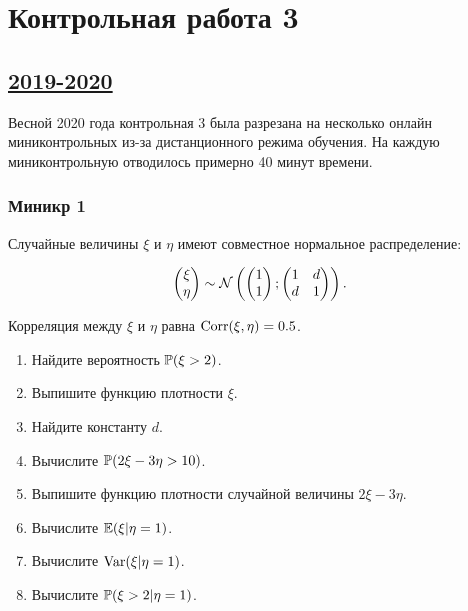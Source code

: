 \newpage
\thispagestyle{empty}
\section{Контрольная работа 3}


\subsection[2019-2020]{\hyperref[sec:sol_kr_03_2019_2020]{2019-2020}}
\label{sec:kr_03_2019_2020}

Весной 2020 года контрольная 3 была разрезана на несколько онлайн миниконтрольных из-за дистанционного режима обучения.
На каждую миниконтрольную отводилось примерно 40 минут времени. 

\subsubsection*{Миникр 1}

Случайные величины $\xi$ и $\eta$ имеют совместное нормальное распределение:

\[
\begin{pmatrix}
  \xi \\
  \eta \\
\end{pmatrix}   \sim 
\cN \left(
\begin{pmatrix}
1 \\
1 \\
\end{pmatrix};
\begin{pmatrix}
  1 & d \\
  d & 1 \\
\end{pmatrix}
\right).
\]

Корреляция между $\xi$ и $\eta$ равна $\Corr(\xi, \eta)= 0.5$.


\begin{enumerate}
\item Найдите вероятность $\P(\xi > 2)$.
\item Выпишите функцию плотности $\xi$.
\item Найдите константу $d$. 
\item Вычислите $\P(2\xi -3\eta >10)$.
\item Выпишите функцию плотности случайной величины $2\xi -3\eta$.
\item Вычислите $\E(\xi |\eta = 1)$.
\item Вычислите $\Var(\xi |\eta = 1)$.
\item Вычислите $\P(\xi > 2 |\eta = 1)$.
\end{enumerate}


